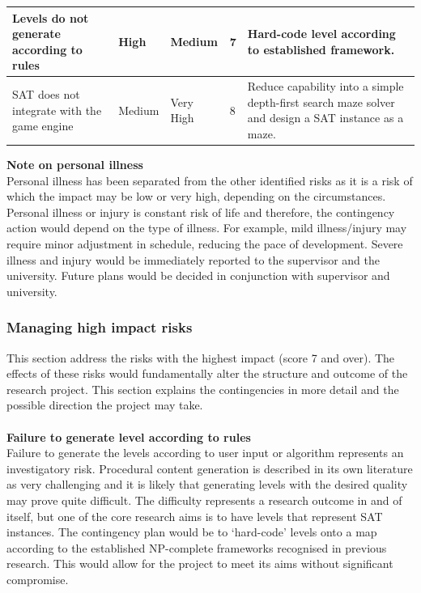 \documentclass[a4paper]{article}
\begin{document}
\begin{center}
\begin{tabular}{ | p{4.2cm} | l | p{2.1cm} | p{1.1cm} | p{5cm} |}
Levels do not generate according to rules & High & Medium & 7 & Hard-code level according to established framework. \\ \hline


    SAT does not integrate with the game engine & Medium & Very High & 8 & Reduce capability into a simple depth-first search maze solver and design a SAT instance as a maze.
    \\ \hline




    \hline


    \end{tabular}
    \label{risk}
\end{center}

\noindent \textbf{Note on personal illness} \\

\noindent Personal illness has been separated from the other identified risks as it is a risk of
which the impact may be low or very high, depending on the circumstances. Personal illness or injury
is constant risk of life and therefore, the contingency action would depend on the type of illness.
For example, mild illness/injury may require minor adjustment in schedule, reducing the pace of
development. Severe illness and injury would be immediately reported to the supervisor and the
university. Future plans would be decided in conjunction with supervisor and  university.

\subsubsection{Managing high impact risks}

This section address the risks with the highest impact (score 7 and over). The effects of these
risks would fundamentally alter the structure and outcome of the research project. This section
explains the contingencies in more detail and the possible direction the project may take. \\
\\
\noindent \textbf{Failure to generate level according to rules} \\

\noindent Failure to generate the levels according to user input or algorithm represents an
investigatory risk. Procedural content generation is described in its own literature as very
challenging and it is likely that generating levels with the desired quality may prove quite
difficult. The difficulty represents a research outcome in and of itself, but one of the core
research aims is to have levels that represent SAT instances. The contingency plan would be to
`hard-code' levels onto a map according to the established NP-complete frameworks recognised in
previous research. This would allow for the project to meet its aims without significant compromise.\\
\end{document}
